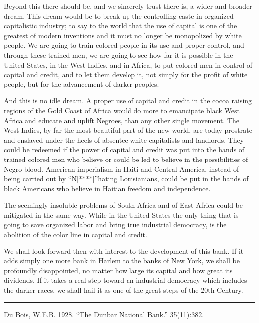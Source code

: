 \documentclass[letterpaper,10pt,english]{jupyterBook}
\begin{document}
\sphinxAtStartPar
Beyond this there should be, and we sincerely trust there is, a wider and broader dream. This dream would be to break up the controlling caste in organized capitalistic industry; to say to the world that the use of capital is one of the greatest of modern inventions and it must no longer be monopolized by white people. We are going to train colored people in its use and proper control, and through these trained men, we are going to see how far it is possible in the United States, in the West Indies, and in Africa, to put colored men in control of capital and credit, and to let them develop it, not simply for the profit of white people, but for the advancement of darker peoples.

\sphinxAtStartPar
And this is no idle dream. A proper use of capital and credit in the cocoa raising regions of the Gold Coast of Africa would do more to emancipate black West Africa and educate and uplift Negroes, than any other single movement. The West Indies, by far the most beautiful part of the new world, are today prostrate and enslaved under the heels of absentee white capitalists and landlords. They could be redeemed if the power of capital and credit was put into the hands of trained colored men who believe or could be led to believe in the possibilities of Negro blood. American imperialism in Haiti and Central America, instead of being carried out by “N{[}****{]}”\sphinxhyphen{}hating Louisianians, could be put in the hands of black Americans who believe in Haitian freedom and independence.

\sphinxAtStartPar
The seemingly insoluble problems of South Africa and of East Africa could be mitigated in the same way. While in the United States the only thing that is going to save organized labor and bring true industrial democracy, is the abolition of the color line in capital and credit.

\sphinxAtStartPar
We shall look forward then with interest to the development of this bank. If it adds simply one more bank in Harlem to the banks of New York, we shall be profoundly disappointed, no matter how large its capital and how great its dividends. If it takes a real step toward an industrial democracy which includes the darker races, we shall hail it as one of the great steps of the 20th Century.


\bigskip\hrule\bigskip


\sphinxAtStartPar
{} Du Bois, W.E.B. 1928. “The Dunbar National Bank.”   35(11):382.
\end{document}
